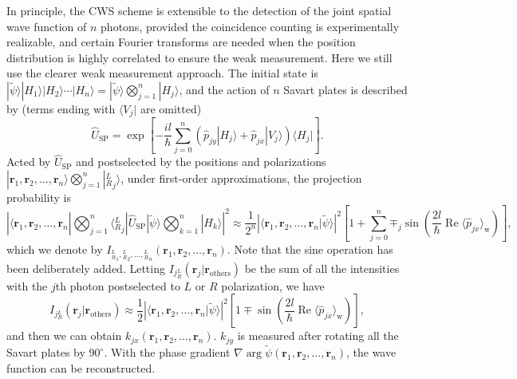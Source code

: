 \documentclass[pra,english,reprint,nofootinbib,aps,superscriptaddress,showpacs,showkeys]{revtex4-2}
\theoremstyle{definition}
\theoremstyle{remark}
\begin{document}
\begin{widetext}
	In principle, the CWS scheme is extensible to the detection of the joint spatial wave function of $n$ photons, provided the coincidence counting is experimentally realizable, and certain Fourier transforms are needed when the position distribution is highly correlated to ensure the weak measurement. Here we still use the clearer weak measurement approach. The initial state is $|\tilde{\psi}\rangle|H_1\rangle|H_2\rangle\cdots|H_n\rangle=|\tilde{\psi}\rangle\bigotimes_{j=1}^n|H_j\rangle$, and the action of $n$ Savart plates is described by (terms ending with $\langle V_j|$ are omitted)
	\begin{equation}
		\hat{U}_\textrm{SP}=\exp\left[-\frac{il}{\hbar}\sum_{j=0}^n\left(\hat{p}_{jy}|H_j\rangle+\hat{p}_{jx}|V_j\rangle\right)\langle H_j|\right].
	\end{equation}
	Acted by $\hat{U}_\textrm{SP}$ and postselected by the positions and polarizations $|\mathbf{r}_1,\mathbf{r}_2,\ldots,\mathbf{r}_n\rangle\bigotimes_{j=1}^n|{^L_R}_j\rangle$, under first-order approximations, the projection probability is
		\begin{equation}
			\left|\langle\mathbf{r}_1,\mathbf{r}_2,\ldots,\mathbf{r}_n|\bigotimes_{j=1}^n\langle{^L_R}_j|\hat{U}_\textrm{SP}|\tilde{\psi}\rangle\bigotimes_{k=1}^n|H_k\rangle\right|^2\approx\frac{1}{2^n}\left|\langle\mathbf{r}_1,\mathbf{r}_2,\ldots,\mathbf{r}_n|\tilde{\psi}\rangle\right|^2\left[1+\sum_{j=0}^n\mp_j\sin\left(\frac{2l}{\hbar}\operatorname{Re}\langle\hat{p}_{jx}\rangle_\textrm{w}\right)\right],
		\end{equation}
		which we denote by $I_{{^L_R}_1,{^L_R}_2,\ldots,{^L_R}_n}(\mathbf{r}_1,\mathbf{r}_2,\ldots,\mathbf{r}_n)$. Note that the sine operation has been deliberately added. Letting $I_{j{^L_R}}(\mathbf{r}_j|\mathbf{r}_\textrm{others})$ be the sum of all the intensities with the $j$th photon postselected to $L$ or $R$ polarization, we have
		\begin{equation}
			I_{j{^L_R}}(\mathbf{r}_j|\mathbf{r}_\textrm{others})\approx\frac{1}{2}\left|\langle\mathbf{r}_1,\mathbf{r}_2,\ldots,\mathbf{r}_n|\tilde{\psi}\rangle\right|^2\left[1\mp\sin\left(\frac{2l}{\hbar}\operatorname{Re}\langle\hat{p}_{jx}\rangle_\textrm{w}\right)\right],
		\end{equation}
		and then we can obtain $k_{jx}(\mathbf{r}_1,\mathbf{r}_2,\ldots,\mathbf{r}_n)$. $k_{jy}$ is measured after rotating all the Savart plates by $90^\circ$. With the phase gradient $\nabla\arg\tilde{\psi}(\mathbf{r}_1,\mathbf{r}_2,\ldots,\mathbf{r}_n)$, the wave function can be reconstructed.
		

\end{widetext}
\end{document}
